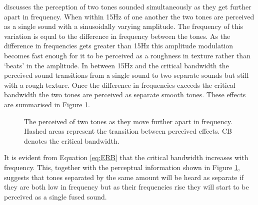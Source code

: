 		\citet{howard2009acoustics} discusses the perception of two tones sounded simultaneously as they get
		further apart in frequency. When within 15Hz of one another the two tones are perceived as a single sound
		with a sinusoidally varying amplitude. The frequency of this variation is equal to the difference in
		frequency between the tones. As the difference in frequencies gets greater than 15Hz this amplitude
		modulation becomes fast enough for it to be perceived as a roughness in texture rather than `beats' in the
		amplitude. In between 15Hz and the critical bandwidth the perceived sound transitions from a single sound
		to two separate sounds but still with a rough texture. Once the difference in frequencies exceeds the
		critical bandwidth the two tones are perceived as separate smooth tones. These effects are summarised in
		Figure \ref{fig:ToneSeparation}.

		\begin{figure}[h!]
			\centering
			\caption{The perceived of two tones as they move further apart in frequency. Hashed areas represent
				 the transition between perceived effects. CB denotes the critical bandwidth.}
			\label{fig:ToneSeparation}
		\end{figure}

		It is evident from Equation \ref{eq:ERB} that the critical bandwidth increases with frequency. This,
		together with the perceptual information shown in Figure \ref{fig:ToneSeparation}, suggests that tones
		separated by the same amount will be heard as separate if they are both low in frequency but as their
		frequencies rise they will start to be perceived as a single fused sound.

